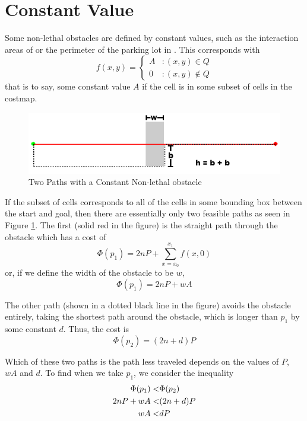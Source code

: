 \section{Constant Value}
Some non-lethal obstacles are defined by constant values, such as the interaction areas of \citet{fraichard:anthronav} or the perimeter of the parking lot in \citet{likhachev:costmaps}. This corresponds with 
\begin{displaymath}
   f(x, y) = \left\{
     \begin{array}{lr}
       A & : (x,y) \in Q\\
       0 & : (x,y) \notin Q
     \end{array}
   \right.
\end{displaymath}
that is to say, some constant value $A$ if the cell is in some subset of cells in the costmap. 

\begin{figure}[!t]
\includegraphics[width=\columnwidth]{graphix/Constant.png}
\caption{Two Paths with a Constant Non-lethal obstacle}
\label{fig:constant}
\end{figure}

If the subset of cells corresponds to all of the cells in some bounding box between the start and goal, then there are essentially only two feasible paths as seen in Figure \ref{fig:constant}. The first (solid red in the figure) is the straight path through the obstacle which has a cost of 
\[ \Phi(p_1) = 2nP + \sum_{x=x_0}^{x_1} f(x, 0) \]
or, if we define the width of the obstacle to be $w$, 
\[ \Phi(p_1) = 2nP + wA \]

The other path (shown in a dotted black line in the figure) avoids the obstacle entirely, taking the shortest path around the obstacle, which is longer than $p_1$ by some constant $d$. Thus, the cost is
\[ \Phi(p_2) = (2n + d)P \]

Which of these two paths is the path less traveled depends on the values of $P$, $wA$ and $d$. To find when we take $p_1$, we consider the inequality 
\begin{align}
\Phi(p_1) < & \Phi(p_2)\notag\\
2nP + wA < & (2n + d)P \notag\\
wA < & dP 
\end{align}

